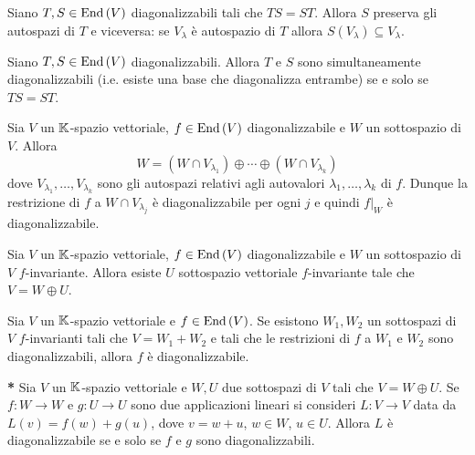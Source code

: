 \begin{prop}
	Siano $ T, S \in \operatorname{End}{(V)} $ diagonalizzabili tali che $ TS = ST $. Allora $ S $ preserva gli autospazi di $ T $ e viceversa: se $ V_{\lambda} $ è autospazio di $ T $ allora $ S(V_{\lambda}) \subseteq V_{\lambda} $. 
\end{prop}

\begin{thm}
	Siano $ T, S \in \operatorname{End}{(V)} $ diagonalizzabili. Allora $ T $ e $ S $ sono simultaneamente diagonalizzabili (i.e. esiste una base che diagonalizza entrambe) se e solo se $ TS = ST $.
\end{thm}

\begin{thm}
	Sia $ V $ un $ \mathbb{K} $-spazio vettoriale, $ f \in \operatorname{End}{(V)} $ diagonalizzabile e $ W $ un sottospazio di $ V $. Allora \[W = (W \cap V_{\lambda_1}) \oplus \cdots \oplus (W \cap V_{\lambda_k})\] dove $ V_{\lambda_1}, \ldots, V_{\lambda_k} $ sono gli autospazi relativi agli autovalori $ \lambda_1, \ldots, \lambda_k $ di $ f $. Dunque la restrizione di $ f $ a $ W \cap V_{\lambda_j} $ è diagonalizzabile per ogni $ j $ e quindi $ f\lvert_{W} $ è diagonalizzabile.
\end{thm}

\begin{thm}
	Sia $ V $ un $ \mathbb{K} $-spazio vettoriale, $ f \in \operatorname{End}{(V)} $ diagonalizzabile e $ W $ un sottospazio di $ V $ $ f $-invariante. Allora esiste $ U $ sottospazio vettoriale $ f $-invariante tale che $ V = W \oplus U $. 
\end{thm}

\begin{thm}
	Sia $ V $ un $ \mathbb{K} $-spazio vettoriale e $ f \in \operatorname{End}{(V)} $. Se esistono $ W_1, W_2 $ un sottospazi di $ V $ $ f $-invarianti tali che $ V = W_1 + W_2 $ e tali che le restrizioni di $ f $ a $ W_1 $ e $ W_2 $ sono diagonalizzabili, allora $ f $ è diagonalizzabile. 
\end{thm}

\begin{thm} \textbf{*}
	Sia $ V $ un $ \mathbb{K} $-spazio vettoriale e $ W, U $ due sottospazi di $ V $ tali che $ V = W \oplus U $. Se $ f \colon W \to W $ e $ g \colon U \to U $ sono due applicazioni lineari si consideri $ L \colon V \to V $ data da $ L(v) = f(w) + g(u) $, dove $ v = w + u $, $ w \in W $, $ u \in U $. Allora $ L $ è diagonalizzabile se e solo se $ f $ e $ g $ sono diagonalizzabili.
\end{thm}

